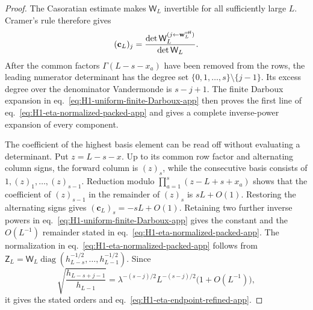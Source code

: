 \documentclass[a4paper,11pt]{article}
\theoremstyle{definition}
\theoremstyle{remark}
\newcommand{\diag}{\operatorname{diag}}
\begin{document}
\begin{proof}
The Casoratian estimate makes \(\mathsf W_L\) invertible for all
sufficiently large \(L\). Cramer's rule therefore gives
\begin{equation}
   (\mathbf c_L)_j
   =
   \frac{
      \det\mathsf W_L^{(j\leftarrow\mathbf w_L^{\rm off})}
   }{\det\mathsf W_L}.
   \label{eq:H1-forward-column-Cramer-app}
\end{equation}
After the common factors \(\Gamma(L-s-x_a)\) have been removed from the
rows, the leading numerator determinant has the degree set
\(\{0,1,\ldots,s\}\setminus\{j-1\}\). Its excess degree over the
denominator Vandermonde is \(s-j+1\). The finite Darboux expansion in
eq.~\eqref{eq:H1-uniform-finite-Darboux-app} then proves the first line
of eq.~\eqref{eq:H1-eta-normalized-packed-app} and gives a complete
inverse-power expansion of every component.

The coefficient of the highest basis element can be read off without
evaluating a determinant. Put \(z=L-s-x\). Up to its common row factor
and alternating column signs, the forward column is \((z)_s\), while
the consecutive basis consists of
\(1,(z)_1,\ldots,(z)_{s-1}\). Reduction modulo
\(\prod_{a=1}^{s}(z-L+s+x_a)\) shows that the coefficient of
\((z)_{s-1}\) in the remainder of \((z)_s\) is
\(sL+O(1)\). Restoring the alternating signs gives
\((\mathbf c_L)_s=-sL+O(1)\). Retaining two further inverse powers in
eq.~\eqref{eq:H1-uniform-finite-Darboux-app} gives the constant and the
\(O(L^{-1})\) remainder stated in
eq.~\eqref{eq:H1-eta-normalized-packed-app}. 
The normalization in eq.~\eqref{eq:H1-eta-normalized-packed-app} follows from
\(\mathsf Z_L=\mathsf W_L
\diag(h_{L-s}^{-1/2},\ldots,h_{L-1}^{-1/2})\). Since
\begin{equation}
   \sqrt{\frac{h_{L-s+j-1}}{h_{L-1}}}
   =
   \lambda^{-(s-j)/2}L^{-(s-j)/2}
   \bigl(1+O(L^{-1})\bigr),
   \label{eq:H1-endpoint-norm-ratio-app}
\end{equation}
it gives the stated orders and
eq.~\eqref{eq:H1-eta-endpoint-refined-app}.


\end{proof}
\end{document}
